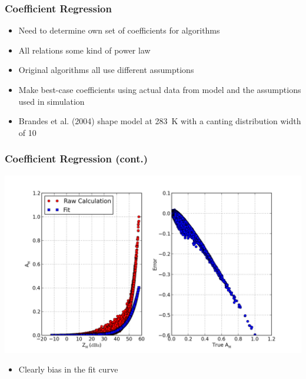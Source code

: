 \documentclass[red]{beamer}
\begin{document}
\begin{frame}[<+->]
	\frametitle{Coefficient Regression}
	\begin{itemize}
		\item Need to determine own set of coefficients for algorithms
		\item All relations some kind of power law
		\item Original algorithms all use different assumptions
		\item Make best-case coefficients using actual data from model and
		the assumptions used in simulation
		\item Brandes et al. (2004) shape model at \SI{283}{\kelvin} with a canting distribution width of 10
	\end{itemize}
\end{frame}

\begin{frame}
	\frametitle{Coefficient Regression (cont.)}
	\begin{center}
		\includegraphics[scale=0.35]{figures/basic_power_law.png}
	\end{center}
	\begin{itemize}
		\item Clearly bias in the fit curve
	\end{itemize}
\end{frame}
\end{document}
